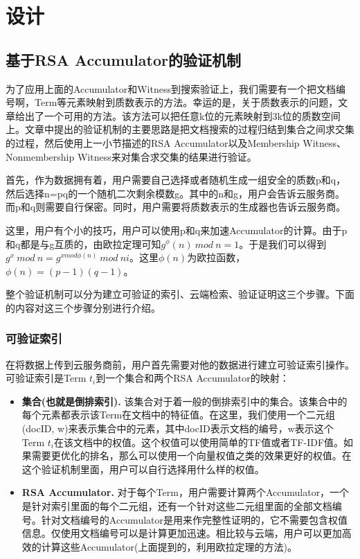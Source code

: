 \chapter{设计}
\label{chap:design}


\section{基于RSA Accumulator的验证机制}
为了应用上面的Accumulator和Witness到搜索验证上，我们需要有一个把文档编号啊，Term等元素映射到质数表示的方法。幸运的是，关于质数表示的问题，文章\cite{gennaro1999secure,goodrich2002efficient}给出了一个可用的方法。该方法可以把任意k位的元素映射到3k位的质数空间上。文章\cite{verifiableindex}中提出的验证机制的主要思路是把文档搜索的过程归结到集合之间求交集的过程，然后使用上一小节描述的RSA Accumulator以及Membership Witness、Nonmembership Witness来对集合求交集的结果进行验证。

首先，作为数据拥有着，用户需要自己选择或者随机生成一组安全的质数p和q，然后选择n=pq的一个随机二次剩余模数g。其中的n和g，用户会告诉云服务商。而p和q则需要自行保密。同时，用户需要将质数表示的生成器也告诉云服务商。

这里，用户有个小的技巧，用户可以使用p和q来加速Accumulator的计算。由于p和q都是与g互质的，由欧拉定理可知$g^\phi(n)\ mod\ n = 1$。于是我们可以得到$g^x\ mod\ n  = g^{x mod \phi(n)}\ mod\ ni$。这里$\phi(n)$为欧拉函数，$\phi(n) = (p-1)(q-1)$。

整个验证机制可以分为建立可验证的索引、云端检索、验证证明这三个步骤。下面的内容对这三个步骤分别进行介绍。

\subsection{可验证索引}
在将数据上传到云服务商前，用户首先需要对他的数据进行建立可验证索引操作。可验证索引是Term $t_i$到一个集合和两个RSA Accumulator的映射：
\begin{itemize}
\item \textbf{集合(也就是倒排索引).} 该集合对于着一般的倒排索引中的集合。该集合中的每个元素都表示该Term在文档中的特征值。在这里，我们使用一个二元组(docID, w)来表示集合中的元素，其中docID表示文档的编号，w表示这个Term $t_i$在该文档中的权值。这个权值可以使用简单的TF值或者TF-IDF值。如果需要更优化的排名，那么可以使用一个向量权值\cite{qin2010letor}之类的效果更好的权值。在这个验证机制里面，用户可以自行选择用什么样的权值。
\item \textbf{RSA Accumulator.} 对于每个Term，用户需要计算两个Accumulator，一个是针对索引里面的每个二元组，还有一个针对这些二元组里面的全部文档编号。针对文档编号的Accumulator是用来作完整性证明的，它不需要包含权值信息。仅使用文档编号可以是计算更加迅速。相比较与云端，用户可以更加高效的计算这些Accumulator(上面提到的，利用欧拉定理的方法)。
\end{itemize}

